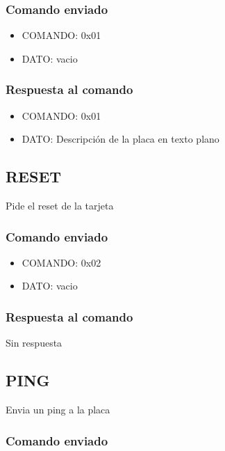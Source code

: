 \documentclass[a4paper,11pt]{article}
\begin{document}
\subsubsection*{Comando enviado}
\label{init_comando_enviado}

\begin{itemize}
	\item{COMANDO:} 0x01
	\item{DATO:} vacio
\end{itemize}

\subsubsection*{Respuesta al comando}
\label{init_respuesta}

\begin{itemize}
	\item{COMANDO:} 0x01
	\item{DATO:} Descripci\'on de la placa en texto plano
\end{itemize}

\subsection{RESET}
\label{reset}

Pide el reset de la tarjeta

\subsubsection*{Comando enviado}
\label{reset_comando_enviado}

\begin{itemize}
	\item{COMANDO:} 0x02
	\item{DATO:} vacio
\end{itemize}

\subsubsection*{Respuesta al comando}
\label{reset_respuesta}

Sin respuesta

\subsection{PING}
\label{ping}

Envia un ping a la placa

\subsubsection*{Comando enviado}
\label{ping_comando_enviado}
\end{document}
